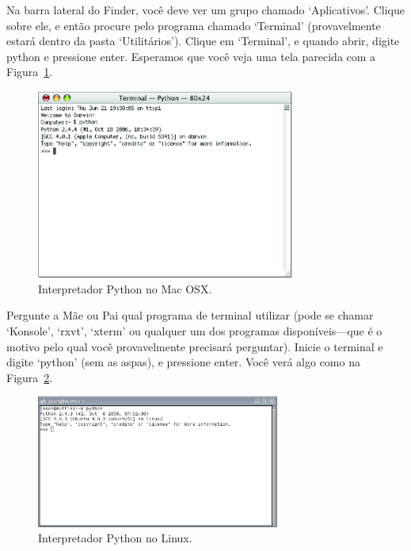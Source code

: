 \begin{MAC}
Na barra lateral do Finder, você deve ver um grupo chamado `Aplicativos'. Clique sobre ele, e então procure pelo programa chamado `Terminal' (provavelmente estará dentro da pasta `Utilitários').
Clique em `Terminal', e quando abrir, digite python e pressione enter. Esperamos que você veja uma tela parecida com a Figura~\ref{fig3}.

\begin{figure}
\begin{center}
\includegraphics[width=85mm]{eps/figure3.eps}
\end{center}
\caption{Interpretador Python no Mac OSX.}\label{fig3}
\end{figure}
\end{MAC}

\begin{LINUX}
Pergunte a Mãe ou Pai qual programa de terminal utilizar (pode se chamar `Konsole', `rxvt', `xterm' ou qualquer um dos programas disponíveis---que é o motivo pelo qual você provavelmente precisará perguntar). Inicie o terminal e digite `python' (sem as aspas), e pressione enter. Você verá algo como na Figura~\ref{fig4}.

\begin{figure}
\begin{center}
\includegraphics[width=80mm]{eps/figure4.eps}
\end{center}
\caption{Interpretador Python no Linux.}\label{fig4}
\end{figure}
\end{LINUX}

